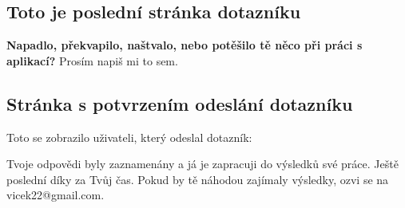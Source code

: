 \subsection{Toto je poslední stránka dotazníku}
\textbf{Napadlo, překvapilo, naštvalo, nebo potěšilo tě něco při práci s aplikací?} Prosím napiš mi to sem.
\newline
\newline
\newline
\newline

\subsection{Stránka s potvrzením odeslání dotazníku}
Toto se zobrazilo uživateli, který odeslal dotazník:

Tvoje odpovědi byly zaznamenány a já je zapracuji do výsledků své práce. Ještě poslední díky za Tvůj čas. Pokud by tě náhodou zajímaly výsledky, ozvi se na vicek22@gmail.com.